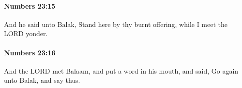 		\paragraph{Numbers 23:15} %
			\label{NUMBERS-23-15}

			And he said unto Balak, Stand here by thy burnt offering, while I meet the LORD yonder.


		\paragraph{Numbers 23:16} %
			\label{NUMBERS-23-16}

			And the LORD met Balaam, and put a word in his mouth, and said, Go again unto Balak, and say thus.


